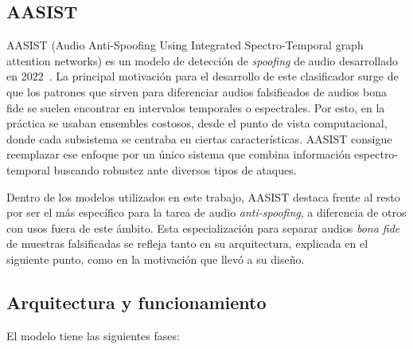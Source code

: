 \subsection{AASIST}
\label{subsubsec:eda_aasist}
AASIST (Audio Anti-Spoofing Using Integrated Spectro-Temporal graph attention networks) es un modelo de detección de \textit{spoofing} de audio desarrollado en 2022~\parencite{aasist2022}. La principal motivación para el desarrollo de este clasificador surge de que los patrones que sirven para diferenciar audios falsificados de audios bona fide se suelen encontrar en intervalos temporales o espectrales. Por esto, en la práctica se usaban ensembles costosos, desde el punto de vista computacional, donde cada subsistema se centraba en ciertas características. AASIST consigue reemplazar ese enfoque por un único sistema que combina información espectro-temporal buscando robustez ante diversos tipos de ataques.

Dentro de los modelos utilizados en este trabajo, AASIST destaca frente al resto por ser el más específico para la tarea de audio \textit{anti-spoofing}, a diferencia de otros con usos fuera de este ámbito. Esta especialización para separar audios \textit{bona fide} de muestras falsificadas se refleja tanto en su arquitectura, explicada en el siguiente punto, como en la motivación que llevó a su diseño.
\subsection*{Arquitectura y funcionamiento}

El modelo tiene las siguientes fases:

